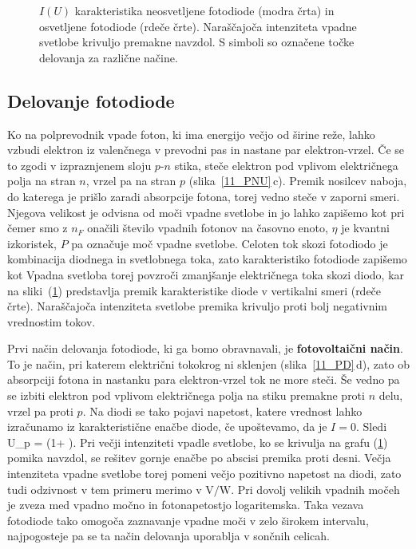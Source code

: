 \begin{figure}[h]
\centering
\def\svgwidth{100truemm} 

\caption{$I(U)$ karakteristika neosvetljene fotodiode (modra črta)
in osvetljene fotodiode (rdeče črte). Naraščajoča intenziteta vpadne svetlobe
krivuljo premakne navzdol. S simboli so označene točke delovanja za različne načine.
}
\label{11_IU}
\end{figure}
 
\subsection*{Delovanje fotodiode}
Ko na polprevodnik vpade foton, ki ima energijo večjo od širine reže, 
lahko vzbudi elektron iz valenčnega v prevodni pas in nastane par elektron-vrzel. 
Če se to zgodi v izpraznjenem sloju $p$-$n$ stika, steče elektron pod vplivom 
električnega polja na stran $n$, vrzel pa na stran $p$ (slika~\ref{11_PNU}\,c). 
Premik nosilcev naboja, do katerega je prišlo zaradi absorpcije fotona, 
torej vedno steče v zaporni smeri. 
Njegova velikost je odvisna od moči vpadne svetlobe in jo lahko zapišemo kot  
pri čemer smo z $n_F$ onačili število vpadnih fotonov na časovno enoto, 
$\eta$ je kvantni izkoristek,
$P$ pa označuje moč vpadne svetlobe. Celoten tok skozi fotodiodo je kombinacija diodnega 
in svetlobnega toka, zato karakteristiko fotodiode zapišemo kot 
Vpadna svetloba torej povzroči zmanjšanje električnega toka skozi diodo, 
kar na sliki~(\ref{11_IU}) predstavlja premik karakteristike diode v vertikalni 
smeri (rdeče črte). Naraščajoča intenziteta svetlobe premika krivuljo proti 
bolj negativnim vrednostim tokov. 

Prvi način delovanja fotodiode, ki ga bomo obravnavali, je {\bf fotovoltaični način}.
To je način, pri katerem električni tokokrog ni sklenjen (slika~\ref{11_PD}\,d), 
zato ob absorpciji fotona in nastanku
para elektron-vrzel tok ne more steči. Še vedno pa se izbiti elektron pod vplivom električnega polja
na stiku premakne proti $n$ delu, vrzel pa proti $p$. Na diodi se tako pojavi napetost, 
katere vrednost lahko izračunamo iz karakteristične enačbe diode, če upoštevamo, da je $I=0$. Sledi
\beq
U_p = \ln \left(1+ \right).
\eeq
Pri večji intenziteti vpadle svetlobe, ko se krivulja na grafu (\ref{11_IU}) pomika navzdol, se rešitev
gornje enačbe po abscisi premika proti desni. Večja intenziteta vpadne svetlobe torej pomeni večjo 
pozitivno napetost na diodi, zato tudi odzivnost v tem primeru merimo v $\si{\volt}/\si{\watt}$.
Pri dovolj velikih vpadnih močeh je zveza med vpadno močno in fotonapetostjo
logaritemska. Taka vezava fotodiode tako omogoča zaznavanje vpadne moči v zelo širokem intervalu,
najpogosteje pa se ta način delovanja uporablja v sončnih celicah. 

